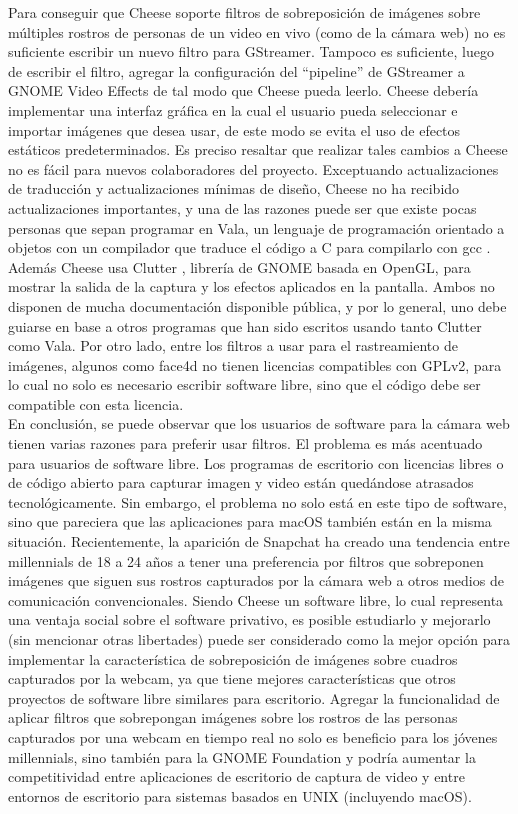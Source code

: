 \documentclass[a4paper,openright,12pt]{report}
\begin{document}
Para conseguir que Cheese soporte filtros de sobreposición de imágenes sobre múltiples
rostros de personas de un video en vivo (como de la cámara web) no es suficiente
escribir un nuevo filtro para GStreamer. Tampoco es suficiente, luego de
escribir el filtro, agregar la
configuración del “pipeline” de GStreamer a GNOME Video Effects de tal modo que
Cheese pueda leerlo. Cheese debería implementar una interfaz gráfica en la cual
el usuario pueda seleccionar e importar imágenes que desea usar, de este modo
se evita el uso de efectos estáticos predeterminados. Es preciso resaltar que
realizar tales cambios a Cheese no es fácil para nuevos colaboradores del
proyecto. Exceptuando actualizaciones de traducción y actualizaciones mínimas
de diseño, Cheese no ha recibido actualizaciones importantes, y una de las razones puede
ser que existe pocas personas que sepan programar en Vala, un lenguaje de
programación orientado a objetos con un compilador que traduce el
código a C para compilarlo con gcc \cite{valaOverview}. Además Cheese
usa Clutter \cite{CheeseDependencyClutter}, librería de GNOME basada en OpenGL,
para mostrar la salida de la captura y los efectos aplicados en la pantalla.
Ambos no disponen de mucha documentación disponible pública, y por lo general,
uno debe guiarse en base a otros programas que han sido escritos usando tanto
Clutter como Vala. Por otro lado, entre los filtros a usar para el rastreamiento
de imágenes, algunos como face4d no tienen licencias compatibles con GPLv2, para
lo cual no solo es necesario escribir software libre, sino que el código debe
ser compatible con esta licencia.\\

En conclusión, se puede observar que los usuarios de software para la cámara web
tienen varias razones para preferir usar filtros. El problema es más acentuado para
usuarios de software libre. Los programas de escritorio con licencias libres o
de código abierto para capturar imagen y video están quedándose atrasados
tecnológicamente. Sin embargo, el problema no solo está en este tipo de software,
sino que pareciera que las aplicaciones para macOS también están en la misma
situación. Recientemente, la aparición de Snapchat ha creado una tendencia entre
millennials de 18 a 24 años a tener una preferencia por filtros que sobreponen
imágenes que siguen sus rostros capturados por la cámara web a otros medios
de comunicación convencionales. Siendo Cheese un software libre, lo cual
representa una ventaja social sobre el software privativo, es posible estudiarlo
y mejorarlo (sin mencionar otras libertades) puede ser considerado como la mejor
opción para implementar la característica de sobreposición de imágenes sobre
cuadros capturados por la webcam, ya que tiene mejores características que otros
proyectos de software libre similares para escritorio. Agregar la funcionalidad
de aplicar filtros que sobrepongan imágenes sobre los rostros de las personas
capturados por una webcam en tiempo real no solo es beneficio para los jóvenes
millennials, sino también para la GNOME Foundation y podría aumentar la
competitividad entre aplicaciones de escritorio de captura de video y entre
entornos de escritorio para sistemas basados en UNIX (incluyendo macOS).
\end{document}
